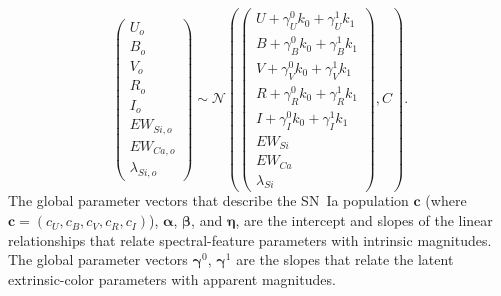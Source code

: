 \documentclass{aastex61}   	%
\begin{document}
\begin{equation}
\begin{pmatrix}
U_o\\B_o\\ V_o\\R_o\\I_o\\EW_{Si, o}\\ EW_{Ca, o} \\ \lambda_{Si, o}
\end{pmatrix}
\sim \mathcal{N}
\left(
\begin{pmatrix}
U +\gamma^0_{U} k_0 +\gamma^1_{U} k_1 \\B +\gamma^0_{B} k_0 +\gamma^1_{B} k_1 \\
V+\gamma^0_{V} k_0+\gamma^1_{V} k_1\\R+\gamma^0_{R} k_0 + \gamma^1_{R} k_1\\I+\gamma^0_{I} k_0+\gamma^1_{I} k_1\\
EW_{Si}\\ EW_{Ca} \\ \lambda_{Si}
\end{pmatrix}
,C
\right).
\label{dust:eqn}
\end{equation}
The global parameter vectors that describe the SN~Ia population
$\mathbf{c}$ (where $\mathbf{c}=(c_U, c_B, c_V, c_R, c_I) $),
$\pmb{\alpha}$, $\pmb{\beta}$,  and $\pmb{\eta}$,  are the intercept and slopes of the linear relationships that
relate spectral-feature parameters with intrinsic magnitudes.
The global parameter vectors $\pmb{\gamma}^0$, $\pmb{\gamma}^1$  are the slopes that relate 
the latent extrinsic-color parameters with apparent magnitudes.  
\end{document}
